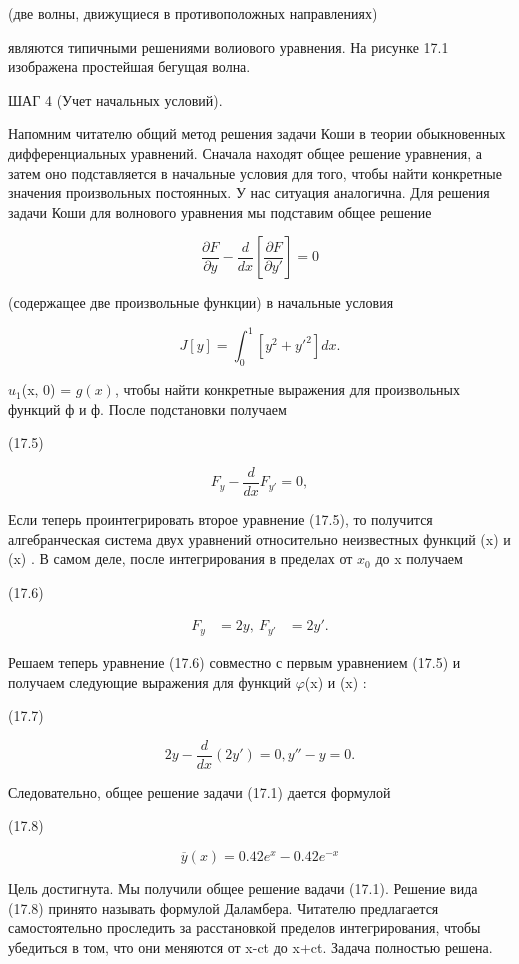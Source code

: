 \documentclass[
  ukrainian,
]{article}
\begin{document}
(две волны, движущиеся в противоположных направлениях)

являются типичными решениями волиового уравнения. На рисунке 17.1
изображена простейшая бегущая волна.

ШАГ 4 (Учет начальных условий).

Напомним читателю общий метод решения задачи Коши в теории обыкновенных
дифференциальных уравнений. Сначала находят общее решение уравнения, а
затем оно подставляется в начальные условия для того, чтобы найти
конкретные значения произвольных постоянных. У нас ситуация аналогична.
Для решения задачи Коши для волнового уравнения мы подставим общее
решение

\[
\frac{\partial F}{\partial y} - \frac{d}{dx} \left[ \frac{\partial F}{\partial y'} \right] = 0
\]

(содержащее две произвольные функции) в начальные условия

\[
J[y] = \int_{0}^{1} [y^{2} + y'^{2}] dx.
\]

\(u_1\)(x, 0) = \(g(x)\), чтобы найти конкретные выражения для
произвольных функций ф и ф. После подстановки получаем

(17.5)

\[
F_y - \frac{d}{dx} F_{y'} = 0,
\]

Если теперь проинтегрировать второе уравнение (17.5), то получится
алгебранческая система двух уравнений относительно неизвестных функций
\varphi(x) и \psi(x) . В самом деле, после интегрирования в пределах от
\(x_0\) до x получаем

(17.6)

\[
\begin{aligned} F_y &= 2y, \ F_{y'} &= 2y'. \end{aligned}
\]

Решаем теперь уравнение (17.6) совместно с первым уравнением (17.5) и
получаем следующие выражения для функций \(\varphi\)(x) и \psi(x) :

(17.7)

\[
2y - \frac{d}{dx}(2y') = 0,
y'' - y = 0.
\]

Следовательно, общее решение задачи (17.1) дается формулой

(17.8)

\[
\overline{y}(x) = 0.42e^x - 0.42e^{-x}
\]

Цель достигнута. Мы получили общее решение вадачи (17.1). Решение вида
(17.8) принято называть формулой Даламбера. Читателю предлагается
самостоятельно проследить за расстановкой пределов интегрирования, чтобы
убедиться в том, что они меняются от x-ct до x+ct. Задача полностью
решена.
\end{document}
